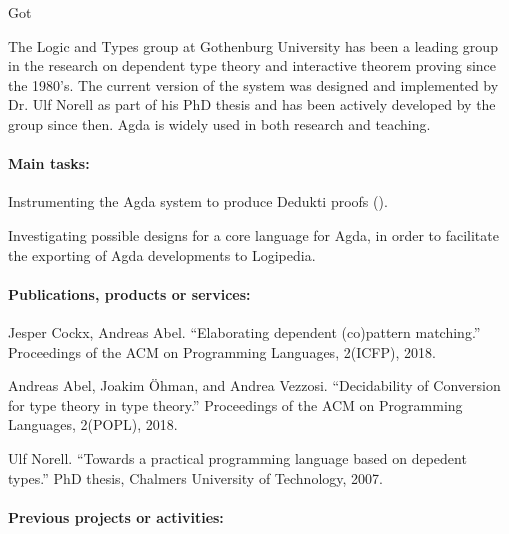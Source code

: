 \begin{sitedescription}{Got}

The Logic and Types group at Gothenburg University has been a leading group
in the research on dependent type theory and interactive theorem proving
since the 1980's. The current version of the system was designed and
implemented by Dr. Ulf Norell as part of his PhD thesis and has been
actively developed by the group since then. Agda is widely used in both
research and teaching.

\paragraph*{Main tasks:}

\begin{compactitem}
\item Instrumenting the Agda system to produce Dedukti proofs
  ().
\item Investigating possible designs for a core language for Agda, in
  order to facilitate the exporting of Agda developments to Logipedia.
\end{compactitem}

\paragraph*{Publications, products or services:}
\begin{compactitem}
  \item Jesper Cockx, Andreas Abel. ``Elaborating dependent
  (co)pattern matching.'' Proceedings of the ACM on Programming
  Languages, 2(ICFP), 2018.
  \item Andreas Abel, Joakim \"Ohman, and Andrea Vezzosi. ``Decidability of
  Conversion for type theory in type theory.'' Proceedings of the ACM on Programming
  Languages, 2(POPL), 2018.
  \item Ulf Norell. ``Towards a practical programming language based on
  depedent types.'' PhD thesis, Chalmers University of Technology, 2007.
\end{compactitem}

\paragraph*{Previous projects or activities:}


\end{sitedescription}
